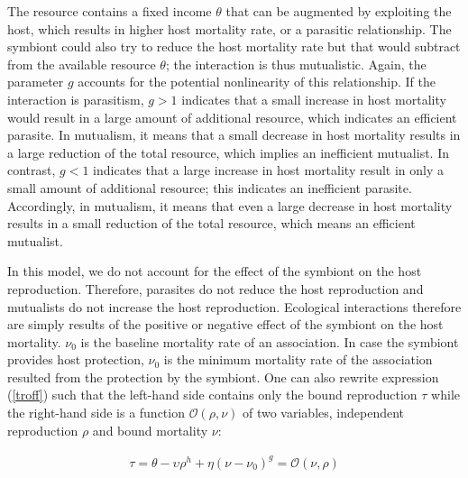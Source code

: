\documentclass[11.5pt]{article}
\begin{document}
\medskip

The resource contains a fixed income $\theta$ that can be augmented by exploiting the host, which results in higher host mortality rate, or a parasitic relationship. The symbiont could also try to reduce the host mortality rate but that would subtract from the available resource $\theta$; the interaction is thus mutualistic. Again, the parameter $g$ accounts for the potential nonlinearity of this relationship. If the interaction is parasitism, $g > 1$ indicates that a small increase in host mortality would result in a large amount of additional resource, which indicates an efficient parasite. In mutualism, it means that a small decrease in host mortality results in a large reduction of the total resource, which implies an inefficient mutualist. In contrast, $g < 1$ indicates that a large increase in host mortality result in only a small amount of additional resource; this indicates an inefficient parasite. Accordingly, in mutualism, it means that even a large decrease in host mortality results in a small reduction of the total resource, which means an efficient mutualist. 

\medskip

In this model, we do not account for the effect of the symbiont on the host reproduction. Therefore, parasites do not reduce the host reproduction and mutualists do not increase the host reproduction. Ecological interactions therefore are simply results of the positive or negative effect of the symbiont on the host mortality. $\nu_0$ is the baseline mortality rate of an association. In case the symbiont provides host protection, $\nu_0$ is the minimum mortality rate of the association resulted from the protection by the symbiont. One can also rewrite expression (\ref{troff}) such that the left-hand side contains only the bound reproduction $\tau$ while the right-hand side is a function  $\mathcal{O}(\rho, \nu)$ of two variables, independent reproduction $\rho$ and bound mortality $\nu$:


\begin{align*}
\tau = \theta - \upsilon \rho^h + \eta (\nu - \nu_0)^g = \mathcal{O}(\nu, \rho)
\end{align*}
\end{document}
